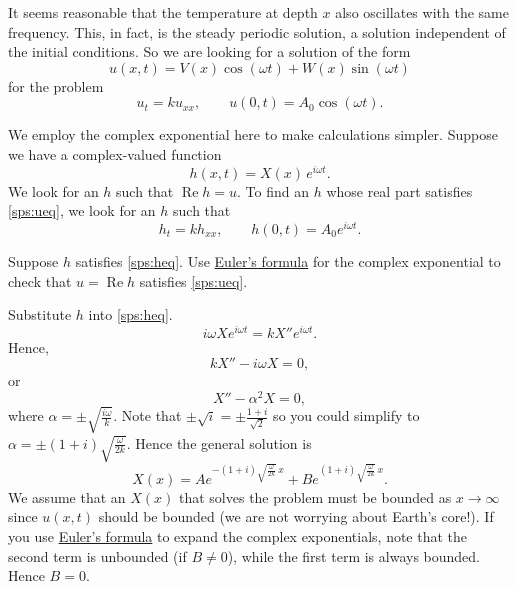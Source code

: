 It seems reasonable that the temperature at depth $x$ also oscillates
with the same frequency.  This, in fact, is the steady periodic
solution, a solution independent of the initial conditions.
So we are looking for a solution of the form
\begin{equation*}
u(x,t) = V(x) \cos (\omega t) + W (x) \sin ( \omega t)
\end{equation*}
for the problem
\begin{equation} \label{sps:ueq}
u_t = k u_{xx}, \qquad u(0,t) = A_0 \cos ( \omega t) .
\end{equation}

We employ the complex exponential here to make calculations simpler.
Suppose we have a complex-valued function
\begin{equation*}
h(x,t) = X(x)\, e^{i\omega t} .
\end{equation*}
We look for an $h$ such that $\operatorname{Re} h = u$.
To find an $h$ whose real part satisfies \eqref{sps:ueq}, we look for
an $h$ such that
\begin{equation} \label{sps:heq}
h_t = k h_{xx}, \qquad h(0,t) = A_0 e^{i\omega t} .
\end{equation}

\begin{exercise}
Suppose $h$ satisfies \eqref{sps:heq}.
Use \hyperref[eulersformula]{Euler's formula} for the complex exponential to
check that $u = \operatorname{Re} h$ satisfies \eqref{sps:ueq}.
\end{exercise}

Substitute $h$ into \eqref{sps:heq}.
\begin{equation*}
i\omega X e^{i\omega t} = k X'' e^{i \omega t} .
\end{equation*}
Hence,
\begin{equation*}
k X''  - i \omega X = 0 ,
\end{equation*}
or 
\begin{equation*}
X''  - \alpha^2 X = 0 ,
\end{equation*}
where $\alpha = \pm \sqrt{\frac{i\omega}{k}}$.  Note that $\pm \sqrt{i} = \pm
\frac{1+i}{\sqrt{2}}$ so you could simplify to
$\alpha = \pm (1+i)\sqrt{\frac{\omega}{2k}}$.
Hence the general solution is
\begin{equation*}
X(x) = A e^{-(1+i)\sqrt{\frac{\omega}{2k}} \, x}
+ B e^{(1+i)\sqrt{\frac{\omega}{2k}} \, x} .
\end{equation*}
We assume that an $X(x)$ that solves the problem must be bounded as $x \to
\infty$ since $u(x,t)$ should be bounded
(we are not worrying about Earth's core!).
If you use \hyperref[eulersformula]{Euler's formula} to expand the complex exponentials, 
note that the second term is unbounded (if $B \neq 0$),
while the first term is always bounded.  Hence $B=0$.

